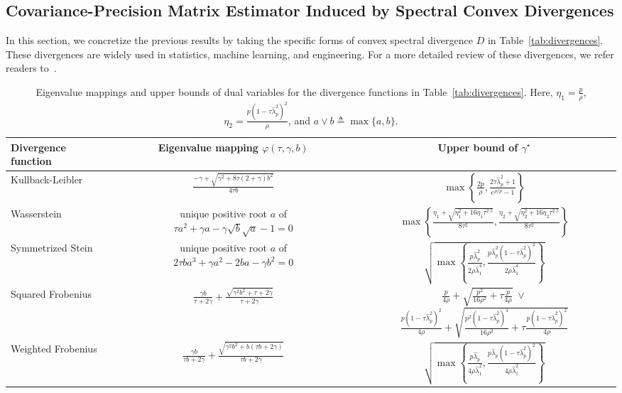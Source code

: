 \documentclass[11pt]{article}
\newcommand{\opt}{^\star}
\newcommand{\Let}{\triangleq}
\newcommand{\wh}{\widehat}
\begin{document}
\subsection{Covariance-Precision Matrix Estimator Induced by Spectral Convex Divergences}\label{sec:SCOPE-example}

In this section, we concretize the previous results by taking the specific forms of convex spectral divergence $D$ in Table~\ref{tab:divergences}. These divergences are widely used in statistics, machine learning, and engineering. For a more detailed review of these divergences, we refer readers to~\citet[Section 4]{ref:yue2024geometric}.



\begin{table}[h]
\centering
\renewcommand{\arraystretch}{2}
\begin{tabular}{|l|c|c|}
\hline
\textbf{Divergence function} & Eigenvalue mapping \(\varphi(\tau,\gamma,b)\) & Upper bound of $\gamma\opt$ \\ \hline
Kullback-Leibler  & $\frac{-\gamma+\sqrt{\gamma^2+8\tau(2+\gamma)b^2}}{4\tau b}$
 & $\max\left\{\frac{2p}{ \rho},\frac{2\tau \wh\lambda_p^2+1}{e^{ \rho/p}-1}\right\}$
 \\ \hline
Wasserstein  & \makecell{unique positive root $a$ of \\$\tau a^2+\gamma a - \gamma\sqrt{b}\sqrt{a}-1=0$}
 & $\max\left\{\frac{\eta_1+\sqrt{\eta_1^2+16\eta_1\tau^{2.5}}}{8\tau^2},\frac{\eta_2+\sqrt{\eta_2^2+16\eta_2\tau^{2.5}}}{8\tau^2}\right\}$
 \\ \hline
Symmetrized Stein  & \makecell{unique positive root $a$ of \\$2\tau b a^3 + \gamma a^2 - 2b a-\gamma b^2=0$}
 &$\sqrt{\max\left\{\frac{p\wh\lambda_p^2}{2 \rho \wh\lambda_1^4},\frac{p\wh\lambda_p^2(1-\tau \wh\lambda_p^2)^2}{2 \rho \wh\lambda_1^4}\right\}}$
 \\ \hline
Squared Frobenius & $\frac{\gamma b}{\tau+2\gamma}+\frac{\sqrt{\gamma^2 b^2 + \tau+2\gamma}}{\tau+2\gamma}$
 & \makecell{$\frac{p}{4\rho}+\sqrt{\frac{p^2}{16\rho^2}+\tau\frac{p}{4\rho}}\;\vee$\\ $\frac{p(1-\tau\wh\lambda_p^2)^2}{4\rho}+\sqrt{\frac{p^2(1-\tau\wh\lambda_p^2)^4}{16\rho^2}+\tau\frac{p(1-\tau\wh\lambda_p^2)^2}{4\rho}}$}
 \\ \hline
Weighted Frobenius & $\frac{\gamma b}{\tau b+2\gamma}+\frac{\sqrt{\gamma^2 b^2+b(\tau b+2\gamma)}}{\tau b+2\gamma}$
 & $\sqrt{\max\left\{\frac{p\wh\lambda_p}{4 \rho\wh\lambda_1^2},\frac{p\wh\lambda_p(1-\tau \wh\lambda_p^2)^2}{4 \rho\wh\lambda_1^2}\right\}}$
 \\ \hline
\end{tabular}
\caption{Eigenvalue mappings and upper bounds of dual variables for the divergence functions in Table~\ref{tab:divergences}. Here, $\eta_1 = \frac{p}{\rho}$, $\eta_2 = \frac{p(1-\tau\wh\lambda_p^2)^2}{\rho}$, and $a \vee b \Let \max\{a,b\}$. }
\label{tab:vphi-gamma}
\end{table}
\end{document}
